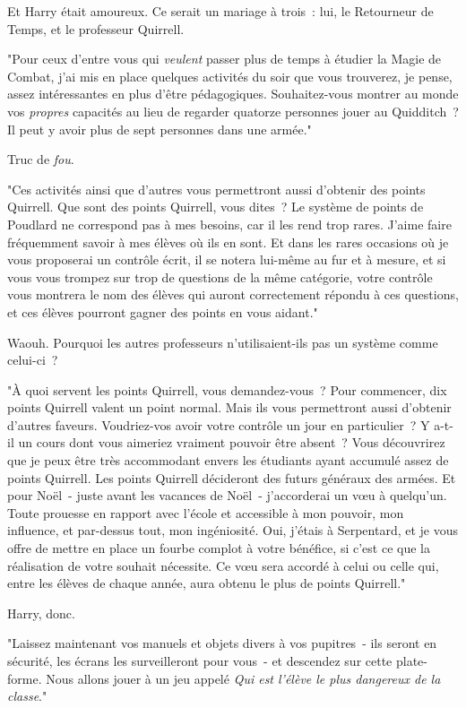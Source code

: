Et Harry était amoureux. Ce serait un mariage à trois~: lui, le Retourneur de Temps, et le professeur Quirrell.

"Pour ceux d'entre vous qui \emph{veulent} passer plus de temps à étudier la Magie de Combat, j'ai mis en place quelques activités du soir que vous trouverez, je pense, assez intéressantes en plus d'être pédagogiques. Souhaitez-vous montrer au monde vos \emph{propres} capacités au lieu de regarder quatorze personnes jouer au Quidditch~? Il peut y avoir plus de sept personnes dans une armée."

Truc de \emph{fou}.

"Ces activités ainsi que d'autres vous permettront aussi d'obtenir des points Quirrell. Que sont des points Quirrell, vous dites~? Le système de points de Poudlard ne correspond pas à mes besoins, car il les rend trop rares. J'aime faire fréquemment savoir à mes élèves où ils en sont. Et dans les rares occasions où je vous proposerai un contrôle écrit, il se notera lui-même au fur et à mesure, et si vous vous trompez sur trop de questions de la même catégorie, votre contrôle vous montrera le nom des élèves qui auront correctement répondu à ces questions, et ces élèves pourront gagner des points en vous aidant."

Waouh. Pourquoi les autres professeurs n'utilisaient-ils pas un système comme celui-ci~?

"À quoi servent les points Quirrell, vous demandez-vous~? Pour commencer, dix points Quirrell valent un point normal. Mais ils vous permettront aussi d'obtenir d'autres faveurs. Voudriez-vos avoir votre contrôle un jour en particulier~? Y a-t-il un cours dont vous aimeriez vraiment pouvoir être absent~? Vous découvrirez que je peux être très accommodant envers les étudiants ayant accumulé assez de points Quirrell. Les points Quirrell décideront des futurs généraux des armées. Et pour Noël~- juste avant les vacances de Noël~- j'accorderai un vœu à quelqu'un. Toute prouesse en rapport avec l'école et accessible à mon pouvoir, mon influence, et par-dessus tout, mon ingéniosité. Oui, j'étais à Serpentard, et je vous offre de mettre en place un fourbe complot à votre bénéfice, si c'est ce que la réalisation de votre souhait nécessite. Ce vœu sera accordé à celui ou celle qui, entre les élèves de chaque année, aura obtenu le plus de points Quirrell."

Harry, donc.

"Laissez maintenant vos manuels et objets divers à vos pupitres~- ils seront en sécurité, les écrans les surveilleront pour vous~- et descendez sur cette plate-forme. Nous allons jouer à un jeu appelé \emph{Qui est l'élève le plus dangereux de la classe}."

